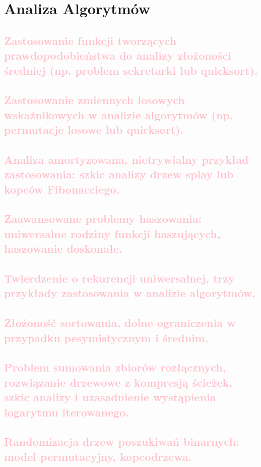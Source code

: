\chapter{Analiza Algorytmów}

\section{\textcolor{pink}{Zastosowanie funkcji tworzących prawdopodobieństwa do analizy złożoności średniej (np. problem sekretarki lub quicksort).}}

\section{\textcolor{pink}{Zastosowanie zmiennych losowych wskaźnikowych w analizie algorytmów (np. permutacje losowe lub quicksort).}}

\section{\textcolor{pink}{Analiza amortyzowana, nietrywialny przykład zastosowania: szkic analizy drzew splay lub kopców Fibonacciego.}}

\section{\textcolor{pink}{Zaawansowane problemy haszowania: uniwersalne rodziny funkcji haszujących, haszowanie doskonałe.}}

\section{\textcolor{pink}{Twierdzenie o rekurencji uniwersalnej, trzy przykłady zastosowania w analizie algorytmów.}}

\section{\textcolor{pink}{Złożoność sortowania, dolne ograniczenia w przypadku pesymistycznym i średnim.}}

\section{\textcolor{pink}{Problem sumowania zbiorów rozłącznych, rozwiązanie drzewowe z kompresją ścieżek, szkic analizy i uzasadnienie wystąpienia logarytmu iterowanego.}}

\section{\textcolor{pink}{Randomizacja drzew poszukiwań binarnych: model permutacyjny, kopcodrzewa.}}